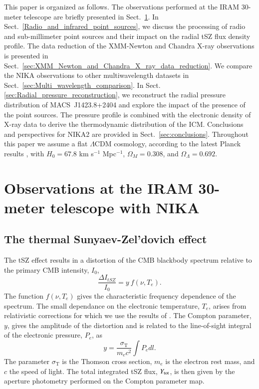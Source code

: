 \documentclass[traditabstract]{aa}
\begin{document}
This paper is organized as follows. The observations performed at the IRAM 30-meter telescope are briefly presented in Sect.~\ref{sec:Observation_at_the_IRAM_30m_telescope_with_NIKA}. In Sect.~\ref{Radio_and_infrared_point_sources}, we discuss the processing of radio and sub-millimeter point sources and their impact on the radial tSZ flux density profile. The data reduction of the XMM-Newton and Chandra X-ray observations is presented in Sect.~\ref{sec:XMM_Newton_and_Chandra_X_ray_data_reduction}. We compare the NIKA observations to other multiwavelength datasets in Sect.~\ref{sec:Multi_wavelength_comparison}. In Sect. \ref{sec:Radial_pressure_reconstruction}, we reconstruct the radial pressure distribution of \mbox{MACS~J1423.8+2404} and explore the impact of the presence of the point sources. The pressure profile is combined with the electronic density of X-ray data to derive the thermodynamic distribution of the ICM. Conclusions and perspectives for NIKA2 are provided in Sect.~\ref{sec:conclusions}. Throughout this paper we assume a flat $\Lambda$CDM cosmology, according to the latest Planck results \citep{planck2014param}, with $H_0 = 67.8$ km s$^{-1}$ Mpc$^{-1}$, $\Omega_M = 0.308$, and $\Omega_{\Lambda} = 0.692$.

\section{Observations at the IRAM 30-meter telescope with NIKA}\label{sec:Observation_at_the_IRAM_30m_telescope_with_NIKA}
\subsection{The thermal Sunyaev-Zel'dovich effect}
The tSZ effect \citep{sunyaev1972,sunyaev1980} results in a distortion of the CMB blackbody spectrum relative to the primary CMB intensity, $I_0$, \citep[e.g.,][]{birkinshaw1999}
\begin{equation}
        \frac{\Delta I_{tSZ}}{I_0} = y \ f(\nu, T_e).
\label{eq:deltaI}
\end{equation}
The function $f(\nu, T_e)$ gives the characteristic frequency dependence of the spectrum. The small dependance on the electronic temperature, $T_e$, arises from relativistic corrections for which we use the results of \cite{itoh1998}. The Compton parameter, $y$, gives the amplitude of the distortion and is related to the line-of-sight integral of the electronic pressure, $P_e$, as 
\begin{equation}
        y = \frac{\sigma_{\mathrm{T}}}{m_{e} c^2} \int P_{e} dl.
        \label{eq:y_compton}
\end{equation}
The parameter $\sigma_{\mathrm{T}}$ is the Thomson cross section, $m_{e}$ is the electron rest mass, and $c$ the speed of light. The total integrated tSZ flux, $Y_{\rm tot}$, is then given by the aperture photometry performed on the Compton parameter map.
\end{document}
